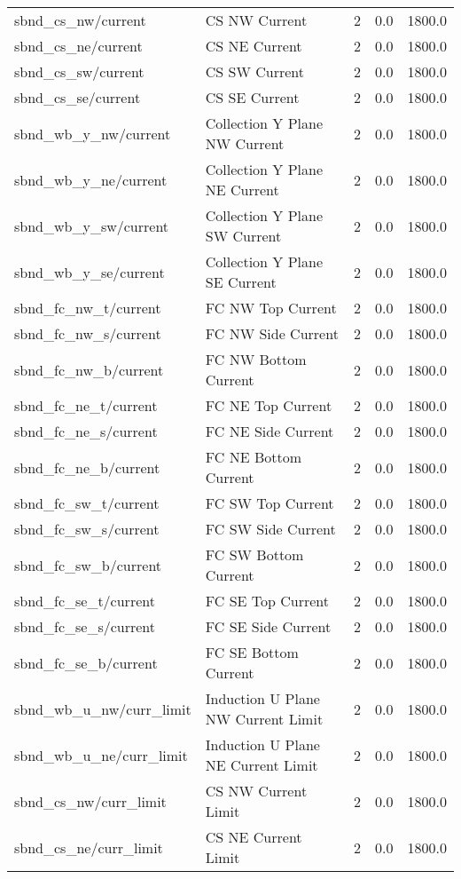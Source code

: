 \begin{center}
\begin{longtable}{l | l l l l }
sbnd\_cs\_nw/current & CS NW Current & 2 & 0.0 & 1800.0\\ 
sbnd\_cs\_ne/current & CS NE Current & 2 & 0.0 & 1800.0\\ 
sbnd\_cs\_sw/current & CS SW Current & 2 & 0.0 & 1800.0\\ 
sbnd\_cs\_se/current & CS SE Current & 2 & 0.0 & 1800.0\\ 
sbnd\_wb\_y\_nw/current & Collection Y Plane NW Current & 2 & 0.0 & 1800.0\\ 
sbnd\_wb\_y\_ne/current & Collection Y Plane NE Current & 2 & 0.0 & 1800.0\\ 
sbnd\_wb\_y\_sw/current & Collection Y Plane SW Current & 2 & 0.0 & 1800.0\\ 
sbnd\_wb\_y\_se/current & Collection Y Plane SE Current & 2 & 0.0 & 1800.0\\ 
sbnd\_fc\_nw\_t/current & FC NW Top Current & 2 & 0.0 & 1800.0\\ 
sbnd\_fc\_nw\_s/current & FC NW Side Current & 2 & 0.0 & 1800.0\\ 
sbnd\_fc\_nw\_b/current & FC NW Bottom Current & 2 & 0.0 & 1800.0\\ 
sbnd\_fc\_ne\_t/current & FC NE Top Current & 2 & 0.0 & 1800.0\\ 
sbnd\_fc\_ne\_s/current & FC NE Side Current & 2 & 0.0 & 1800.0\\ 
sbnd\_fc\_ne\_b/current & FC NE Bottom Current & 2 & 0.0 & 1800.0\\ 
sbnd\_fc\_sw\_t/current & FC SW Top Current & 2 & 0.0 & 1800.0\\ 
sbnd\_fc\_sw\_s/current & FC SW Side Current & 2 & 0.0 & 1800.0\\ 
sbnd\_fc\_sw\_b/current & FC SW Bottom Current & 2 & 0.0 & 1800.0\\ 
sbnd\_fc\_se\_t/current & FC SE Top Current & 2 & 0.0 & 1800.0\\ 
sbnd\_fc\_se\_s/current & FC SE Side Current & 2 & 0.0 & 1800.0\\ 
sbnd\_fc\_se\_b/current & FC SE Bottom Current & 2 & 0.0 & 1800.0\\ 
sbnd\_wb\_u\_nw/curr\_limit & Induction U Plane NW Current Limit & 2 & 0.0 & 1800.0\\ 
sbnd\_wb\_u\_ne/curr\_limit & Induction U Plane NE Current Limit & 2 & 0.0 & 1800.0\\ 
sbnd\_cs\_nw/curr\_limit & CS NW Current Limit & 2 & 0.0 & 1800.0\\ 
sbnd\_cs\_ne/curr\_limit & CS NE Current Limit & 2 & 0.0 & 1800.0\\ 

\end{longtable}
\end{center}
